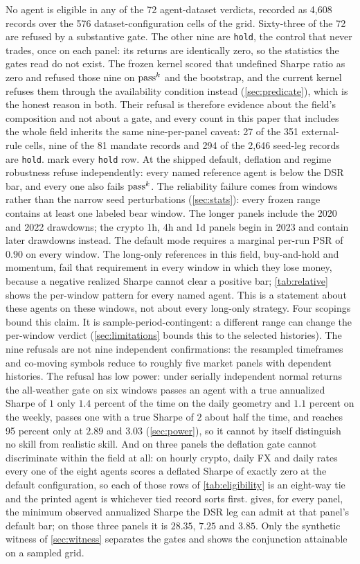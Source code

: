 No agent is eligible in any of the 72 agent-dataset verdicts, recorded as 4{,}608 records over the 576 dataset-configuration cells of the grid. Sixty-three of the 72 are refused by a substantive gate. The other nine are \texttt{hold}, the control that never trades, once on each panel: its returns are identically zero, so the statistics the gates read do not exist. The frozen kernel scored that undefined Sharpe ratio as zero and refused those nine on $\text{pass}^{k}$ and the bootstrap, and the current kernel refuses them through the availability condition instead (\cref{sec:predicate}), which is the honest reason in both. Their refusal is therefore evidence about the field's composition and not about a gate, and every count in this paper that includes the whole field inherits the same nine-per-panel caveat: 27 of the 351 external-rule cells, nine of the 81 mandate records and 294 of the 2{,}646 seed-leg records are \texttt{hold}.  mark every \texttt{hold} row. At the shipped default, deflation and regime robustness refuse independently: every named reference agent is below the DSR bar, and every one also fails $\text{pass}^{k}$. The reliability failure comes from windows rather than the narrow seed perturbations (\cref{sec:stats}): every frozen range contains at least one labeled bear window. The longer panels include the 2020 and 2022 drawdowns; the crypto 1h, 4h and 1d panels begin in 2023 and contain later drawdowns instead. The default mode requires a marginal per-run PSR of $0.90$ on every window. The long-only references in this field, buy-and-hold and momentum, fail that requirement in every window in which they lose money, because a negative realized Sharpe cannot clear a positive bar; \cref{tab:relative} shows the per-window pattern for every named agent. This is a statement about these agents on these windows, not about every long-only strategy. Four scopings bound this claim. It is sample-period-contingent: a different range can change the per-window verdict (\cref{sec:limitations} bounds this to the selected histories). The nine refusals are not nine independent confirmations: the resampled timeframes and co-moving symbols reduce to roughly five market panels with dependent histories. The refusal has low power: under serially independent normal returns the all-weather gate on six windows passes an agent with a true annualized Sharpe of $1$ only $1.4$ percent of the time on the daily geometry and $1.1$ percent on the weekly, passes one with a true Sharpe of $2$ about half the time, and reaches 95 percent only at $2.89$ and $3.03$ (\cref{sec:power}), so it cannot by itself distinguish no skill from realistic skill. And on three panels the deflation gate cannot discriminate within the field at all: on hourly crypto, daily FX and daily rates every one of the eight agents scores a deflated Sharpe of exactly zero at the default configuration, so each of those rows of \cref{tab:eligibility} is an eight-way tie and the printed agent is whichever tied record sorts first.  gives, for every panel, the minimum observed annualized Sharpe the DSR leg can admit at that panel's default bar; on those three panels it is $28.35$, $7.25$ and $3.85$. Only the synthetic witness of \cref{sec:witness} separates the gates and shows the conjunction attainable on a sampled grid.

